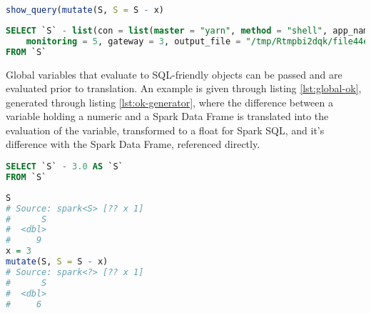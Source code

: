 \documentclass[10pt,a4paper]{article}
\begin{document}
\begin{lstlisting}[language=R, caption={Attempt in R to form new column from the difference between two separate Spark data frames \texttt{S} and \texttt{x}}, label=lst:bad]
show_query(mutate(S, S = S - x)
\end{lstlisting}

\begin{lstlisting}[language=SQL, caption={Spark SQL query generated from attempt to form the difference from two seperate data frames}, label=lst:computer-no]
SELECT `S` - list(con = list(master = "yarn", method = "shell", app_name = "sparklyr", config = list(spark.env.SPARK_LOCAL_IP.local = "127.0.0.1", sparklyr.connect.csv.embedded = "\^1.*", spark.sql.legacy.utcTimestampFunc.enabled = TRUE, sparklyr.connect.cores.local = 4, spark.sql.shuffle.partitions.local = 4), state = <environment>, extensions = list(jars = character(0), packages = character(0), initializers = list(), catalog_jars = character(0)), spark_home = "/shared/spark-3.0.0-preview2-bin-hadoop3.2", backend = 4,
    monitoring = 5, gateway = 3, output_file = "/tmp/Rtmpbi2dqk/file44ec187daaf4_spark.log", sessionId = 58600, home_version = "3.0.0")) AS `S1`, `S` - list(x = "x", vars = "initial") AS `S2`
FROM `S`
\end{lstlisting}

Global variables that evaluate to SQL-friendly objects can be passed and are
evaluated prior to translation.
An example is given through listing \ref{lst:global-ok}, generated through
listing \ref{lst:ok-generator}, where the difference between a variable holding
a numeric and a Spark Data Frame is translated into the evaluation of the
variable, transformed to a float for Spark SQL, and it's difference with the
Spark Data Frame, referenced directly.

\begin{lstlisting}[language=SQL, caption={Spark SQL query generated from attempt to form the difference between a data frame and a numeric}, label=lst:global-ok]
SELECT `S` - 3.0 AS `S`
FROM `S`
\end{lstlisting}

\begin{lstlisting}[language=R, caption={Capacity in sparklyr to form new column from the difference between a spark data frame and a numeric}, label=lst:ok-generator]
S
# Source: spark<S> [?? x 1]
#      S
#  <dbl>
#     9
x = 3
mutate(S, S = S - x)
# Source: spark<?> [?? x 1]
#      S
#  <dbl>
#     6
\end{lstlisting}
\end{document}
